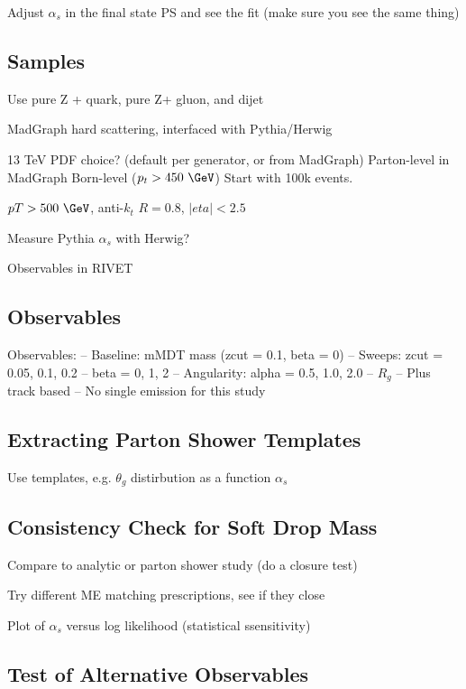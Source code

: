 \documentclass[11pt,letterpaper]{article}
\begin{document}
Adjust $\alpha_s$ in the final state PS and see the fit (make sure you see the same thing)

\subsection{Samples}

	Use pure Z + quark, pure Z+ gluon, and  dijet
	
	MadGraph hard scattering, interfaced with Pythia/Herwig
	
	13 TeV
	PDF choice?  (default per generator, or from MadGraph)
	Parton-level in MadGraph Born-level ($p_t > 450~\GeV$)
	Start with 100k events.
	
	
	$pT > 500~\GeV$, anti-$k_t$ $R = 0.8$, $|eta| < 2.5$

	
	
	Measure Pythia $\alpha_s$  with Herwig?
	
	Observables in RIVET

\subsection{Observables}


Observables:
-- Baseline:  mMDT mass (zcut = 0.1, beta = 0)
-- Sweeps:  zcut = 0.05, 0.1, 0.2
-- beta = 0, 1, 2
-- Angularity:  alpha = 0.5, 1.0, 2.0
-- $R_g$
-- Plus track based
-- No single emission for this study

\subsection{Extracting Parton Shower Templates}

	Use templates, e.g. $\theta_g$ distirbution as a function $\alpha_s$


\subsection{Consistency Check for Soft Drop Mass}
	Compare to analytic or parton shower study (do a closure test)

	Try different ME matching prescriptions, see if they close

	Plot of $\alpha_s$ versus log likelihood (statistical ssensitivity)

\subsection{Test of Alternative Observables}
\end{document}
